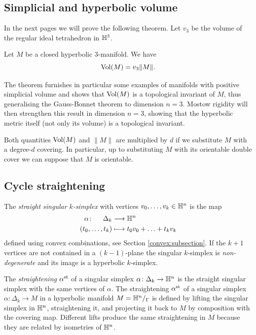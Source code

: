 \subsection{Simplicial and hyperbolic volume}
In the next pages we will prove the following theorem. Let $v_3$ be the volume of the regular ideal tetrahedron in $\mathbb{H}^3$.

\begin{teo} \label{Gromov:teo}
Let $M$ be a closed hyperbolic $3$-manifold. We have 
$${\rm Vol}(M) = v_3\|M\|.$$
\end{teo}
The theorem furnishes in particular some examples of manifolds with positive simplicial volume and shows that ${\rm Vol}(M)$ is a topological invariant of $M$, thus generalising the Gauss-Bonnet theorem to dimension $n=3$. Mostow rigidity will then strengthen this result in dimension $n = 3$, showing that the hyperbolic metric itself (not only its volume) is a topological invariant.

Both quantities ${\rm Vol}(M)$ and $\|M\|$ are multiplied by $d$ if we substitute $M$ with a degree-$d$ covering. In particular, up to substituting $M$ with its orientable double cover we can suppose that $M$ is orientable. 

\subsection{Cycle straightening}
The \emph{straight singular $k$-simplex} with vertices $v_0,\ldots, v_{k} \in \mathbb{H}^n$ is the map
\begin{align*}
\alpha\colon \quad \ \Delta_k & \longrightarrow \mathbb{H}^n \\
(t_0,\ldots, t_{k}) & \longmapsto t_0v_0 + \ldots + t_{k}v_{k}
\end{align*}
defined using convex combinations, see Section \ref{convex:subsection}. If the $k+1$ vertices are not contained in a $(k-1)$-plane the singular $k$-simplex is \emph{non-degenerate} and its image is a hyperbolic $k$-simplex.

The \emph{straightening} $\alpha^{\rm st}$ of a singular simplex $\alpha\colon \Delta_k \to \mathbb{H}^n$ is the straight singular simplex with the same vertices of $\alpha$. The straightening $\alpha^{\rm st}$ of a singular simplex $\alpha\colon\Delta_k\to M$ in a hyperbolic manifold $M=\mathbb{H}^n/_\Gamma$ is defined by lifting the singular simplex in $\mathbb{H}^n$, straightening it, and projecting it back to $M$ by composition with the covering map.
Different lifts produce the same straightening in $M$ because they are related by isometries of $\mathbb{H}^n$. 

